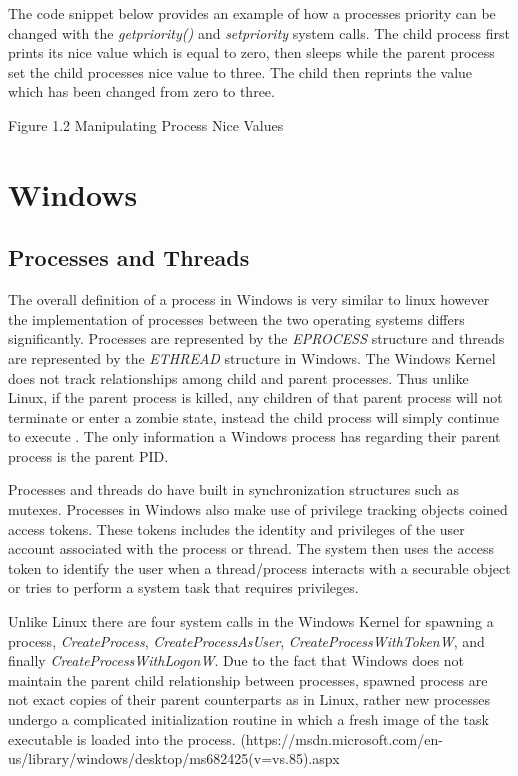	\normalfont \indent The code snippet below provides an example of how a processes priority can be changed with the \textit{getpriority()} and \textit{setpriority} system calls. The child process first prints its nice value which is equal to zero, then sleeps while the parent process set the child processes nice value to three. The child then reprints the value which has been changed from zero to three. 

	 
\begin{center}
Figure 1.2 Manipulating Process Nice Values
\end{center}

\section{\bf Windows}

  \subsection{\bf Processes and Threads}
  \normalfont \indent The overall definition of a process in Windows is very similar to linux however the implementation of processes between the two operating systems differs significantly. Processes are represented by the \textit{EPROCESS} structure and threads are represented by the \textit{ETHREAD} structure in Windows. The Windows Kernel does not track relationships among child and parent processes. Thus unlike Linux, if the parent process is killed, any children of that parent process will not terminate or enter a zombie state, instead the child process will simply continue to execute \cite{windowsInternals}. The only information a Windows process has regarding their parent process is the parent PID.

  \normalfont \indent Processes and threads do have built in synchronization structures such as mutexes. Processes in Windows also make use of privilege tracking objects coined access tokens. These tokens includes the identity and privileges of the user account associated with the process or thread.  The system then uses the access token to identify the user when a thread/process interacts with a securable object or tries to perform a system task that requires privileges.

\normalfont \indent Unlike Linux there are four system calls in the Windows Kernel for spawning a process, \textit{CreateProcess}, \textit{CreateProcessAsUser}, \textit{CreateProcessWithTokenW}, and finally \textit{CreateProcessWithLogonW}.  Due to the fact that Windows does not maintain the parent child relationship between processes, spawned process are not exact copies of their parent counterparts as in Linux, rather new processes undergo a complicated initialization routine in which a fresh image of the task executable is loaded into the process.  (https://msdn.microsoft.com/en-us/library/windows/desktop/ms682425(v=vs.85).aspx 

